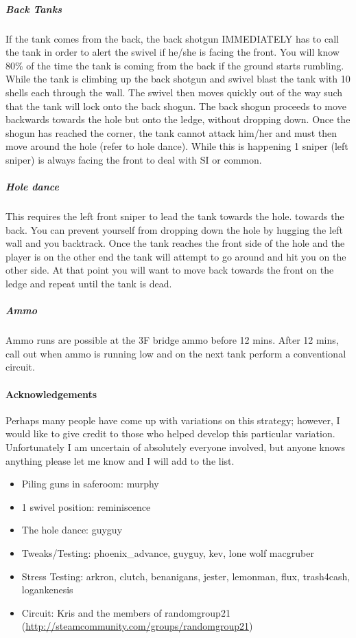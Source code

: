 \subparagraph{Back Tanks}
If the tank comes from the back, the back shotgun IMMEDIATELY has to call the tank in order to alert the swivel if he/she is facing the front. You will know 80\% of the time the tank is coming from the back if the ground starts rumbling. While the tank is climbing up the back shotgun and swivel blast the tank with 10 shells each through the wall. The swivel then moves quickly out of the way such that the tank will lock onto the back shogun. The back shogun proceeds to move backwards towards the hole but onto the ledge, without dropping down. Once the shogun has reached the corner, the tank cannot attack him/her and must then move around the hole (refer to hole dance). While this is happening 1 sniper (left sniper) is always facing the front to deal with SI or common.

\subparagraph{Hole dance}
This requires the left front sniper to lead the tank towards the hole. towards the back. You can prevent yourself from dropping down the hole by hugging the left wall and you backtrack. Once the tank reaches the front side of the hole and the player is on the other end the tank will attempt to go around and hit you on the other side. At that point you will want to move back towards the front on the ledge and repeat until the tank is dead.

\subparagraph{Ammo}
Ammo runs are possible at the 3F bridge ammo before 12 mins.
After 12 mins, call out when ammo is running low and on the next tank perform a conventional circuit.

\paragraph{Acknowledgements}
Perhaps many people have come up with variations on this strategy; however, I would like to give credit to those who helped develop this particular variation. Unfortunately I am uncertain of absolutely everyone involved, but anyone knows anything please let me know and I will add to the list.

\begin{itemize}
\item Piling guns in saferoom: murphy
\item 1 swivel position: reminiscence
\item The hole dance: guyguy
\item Tweaks/Testing: phoenix\_advance, guyguy, kev, lone wolf macgruber
\item Stress Testing: arkron, clutch, benanigans, jester, lemonman, flux, trash4cash, logankenesis
\item Circuit: Kris and the members of randomgroup21 (\url{http://steamcommunity.com/groups/randomgroup21})
\end{itemize}

